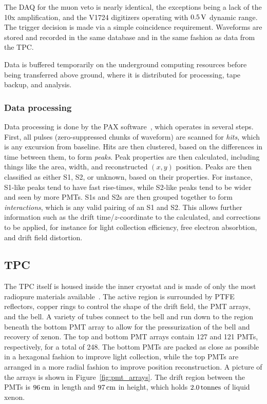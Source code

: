 The DAQ for the muon veto is nearly identical, the exceptions being a lack of the 10x amplification, and the V1724 digitizers operating with $0.5\, \mathrm{V}$ dynamic range. The trigger decision is made via a simple coincidence requirement. Waveforms are stored and recorded in the same database and in the same fashion as data from the TPC.

Data is buffered temporarily on the underground computing resources before being transferred above ground, where it is distributed for processing, tape backup, and analysis.

\subsubsection{Data processing}

Data processing is done by the PAX software~\cite{pax}, which operates in several steps. First, all pulses (zero-suppressed chunks of waveform) are scanned for \textit{hits}, which is any excursion from baseline. Hits are then clustered, based on the differences in time between them, to form \textit{peaks}. Peak properties are then calculated, including things like the area, width, and reconstructed $(x,y)$ position. Peaks are then classified as either S1, S2, or unknown, based on their properties. For instance, S1-like peaks tend to have fast rise-times, while S2-like peaks tend to be wider and seen by more PMTs. S1s and S2s are then grouped together to form \textit{interactions}, which is any valid pairing of an S1 and S2. This allows further information such as the drift time/$z$-coordinate to the calculated, and corrections to be applied, for instance for light collection efficiency, free electron absorbtion, and drift field distortion.

\subsection{TPC}

The TPC itself is housed inside the inner cryostat and is made of only the most radiopure materials available~\cite{Aprile:2017ilq}. The active region is surrounded by PTFE reflectors, copper rings to control the shape of the drift field, the PMT arrays, and the bell. A variety of tubes connect to the bell and run down to the region beneath the bottom PMT array to allow for the pressurization of the bell and recovery of xenon. The top and bottom PMT arrays contain 127 and 121 PMTs, respectively, for a total of 248. The bottom PMTs are packed as close as possible in a hexagonal fashion to improve light collection, while the top PMTs are arranged in a more radial fashion to improve position reconstruction. A picture of the arrays is shown in Figure~\ref{fig:pmt_arrays}. The drift region between the PMTs is $96\, \mathrm{cm}$ in length and $97\, \mathrm{cm}$ in height, which holds $2.0\, \mathrm{tonnes}$ of liquid xenon.

